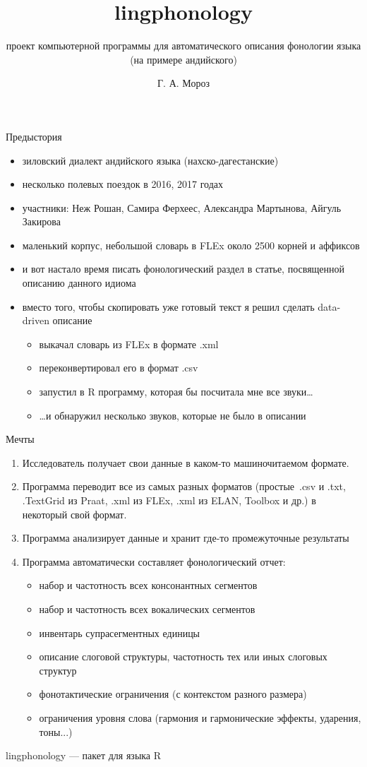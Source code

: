 \documentclass[13pt, t]{beamer}
\title{\huge lingphonology}
\subtitle{проект компьютерной программы для автоматического описания фонологии языка (на примере андийского)}
\author[shortname]{Г. А. Мороз}
\institute{Международная лаборатория языковой конвергенции, НИУ ВШЭ}
\date{\begin{center} 
\large 26 февраля 2018 г. \bigskip \\ {\color{colorblue} Фонологический семинар (МГУ)} \end{center}}
\begin{document}
\begin{frame}[plain]
\maketitle
\end{frame}

\begin{frame}{Предыстория}
\begin{itemize}
\item зиловский диалект андийского языка (нахско-дагестанские)
\item несколько полевых поездок в 2016, 2017 годах
\item участники: Неж Рошан, Самира Ферхеес, Александра Мартынова, Айгуль Закирова
\item маленький корпус, небольшой словарь в  FLEx около 2500 корней и аффиксов \pause
\item и вот настало время писать фонологический раздел в статье, посвященной описанию данного идиома \pause
\item вместо того, чтобы скопировать уже готовый текст я решил сделать data-driven описание
\begin{itemize}
\item  выкачал словарь из FLEx в формате .xml
\item переконвертировал его в формат .csv
\item запустил в R программу, которая бы посчитала мне все звуки… \pause
\item …и  обнаружил несколько звуков, которые не было в описании
\end{itemize}
\end{itemize}
\end{frame}

\begin{frame}{Мечты}
\begin{enumerate}
\item Исследователь получает свои данные в каком-то машиночитаемом формате.
\item Программа переводит все из самых разных форматов (простые~.csv и .txt, .TextGrid из Praat, .xml из FLEx, .xml из ELAN, Toolbox и др.) в некоторый свой формат.
\item Программа анализирует данные и хранит где-то промежуточные результаты
\item Программа автоматически составляет фонологический отчет:
\begin{itemize}
\item набор и частотность всех консонантных сегментов
\item набор и частотность всех вокалических сегментов
\item инвентарь супрасегментных единицы
\item описание слоговой структуры, частотность тех или иных слоговых структур
\item фонотактические ограничения (с контекстом разного размера)
\item ограничения уровня слова (гармония и гармонические эффекты, ударения, тоны...)
\end{itemize}
\end{enumerate}
\vfill
{\Large lingphonology} --- пакет для языка R
\end{frame}
\end{document}
